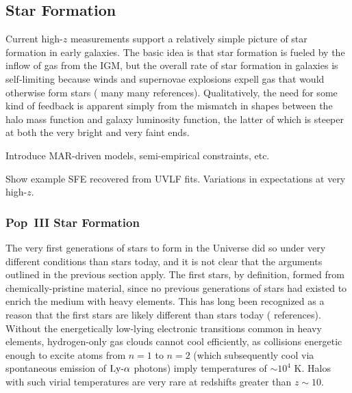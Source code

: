 \subsection{Star Formation}
Current high-$z$ measurements support a relatively simple picture of star formation in early galaxies. The basic idea is that star formation is fueled by the inflow of gas from the IGM, but the overall rate of star formation in galaxies is self-limiting because winds and supernovae explosions expell gas that would otherwise form stars ({\color{red} many many references}). Qualitatively, the need for some kind of feedback is apparent simply from the mismatch in shapes between the halo mass function and galaxy luminosity function, the latter of which is steeper at both the very bright and very faint ends. 

{\color{red} Introduce MAR-driven models, semi-empirical constraints, etc.}

{\color{red} Show example SFE recovered from UVLF fits. Variations in expectations at very high-$z$.}

\subsubsection{Pop~III Star Formation}
The very first generations of stars to form in the Universe did so under very different conditions than stars today, and it is not clear that the arguments outlined in the previous section apply. The first stars, by definition, formed from chemically-pristine material, since no previous generations of stars had existed to enrich the medium with heavy elements. This has long been recognized as a reason that the first stars are likely different than stars today ({\color{red} references}). Without the energetically low-lying electronic transitions common in heavy elements, hydrogen-only gas clouds cannot cool efficiently, as collisions energetic enough to excite atoms from $n=1$ to $n=2$ (which subsequently cool via spontaneous emission of $\text{Ly-}\alpha$ photons) imply temperatures of $\sim 10^4$ K. Halos with such virial temperatures are very rare at redshifts greater than $z \sim 10$.

